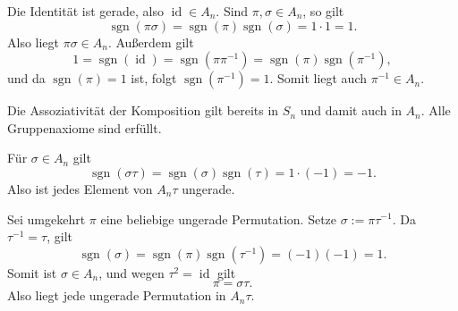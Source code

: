 
\begin{myproof}
Die Identität ist gerade, also \(\operatorname{id}\in A_n\). Sind \(\pi,\sigma\in A_n\), so gilt
\[
\operatorname{sgn}(\pi\sigma)
=\operatorname{sgn}(\pi)\operatorname{sgn}(\sigma)
=1\cdot1=1.
\]
Also liegt \(\pi\sigma\in A_n\). Außerdem gilt
\[
1=\operatorname{sgn}(\operatorname{id})
=\operatorname{sgn}(\pi\pi^{-1})
=\operatorname{sgn}(\pi)\operatorname{sgn}(\pi^{-1}),
\]
und da \(\operatorname{sgn}(\pi)=1\) ist, folgt \(\operatorname{sgn}(\pi^{-1})=1\). Somit liegt auch \(\pi^{-1}\in A_n\).

Die Assoziativität der Komposition gilt bereits in \(S_n\) und damit auch in \(A_n\). Alle Gruppenaxiome sind erfüllt.
\end{myproof}


\begin{myproof}
Für \(\sigma\in A_n\) gilt
\[
\operatorname{sgn}(\sigma\tau)
=\operatorname{sgn}(\sigma)\operatorname{sgn}(\tau)
=1\cdot(-1)=-1.
\]
Also ist jedes Element von \(A_n\tau\) ungerade.

Sei umgekehrt \(\pi\) eine beliebige ungerade Permutation. Setze \(\sigma:=\pi\tau^{-1}\). Da \(\tau^{-1}=\tau\), gilt
\[
\operatorname{sgn}(\sigma)
=\operatorname{sgn}(\pi)\operatorname{sgn}(\tau^{-1})
=(-1)(-1)=1.
\]
Somit ist \(\sigma\in A_n\), und wegen \(\tau^2=\operatorname{id}\) gilt
\[
\pi=\sigma\tau.
\]
Also liegt jede ungerade Permutation in \(A_n\tau\).
\end{myproof}
